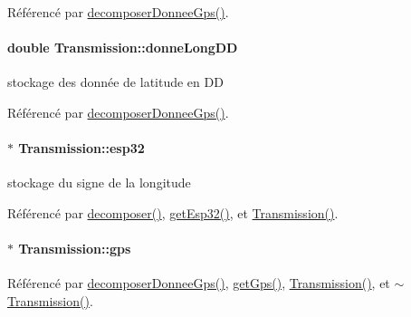 Référencé par \hyperlink{class_transmission_acc25e99cce910d23efe684cad233d30e}{decomposer\+Donnee\+Gps()}.

\paragraph[{\texorpdfstring{donne\+Long\+DD}{donneLongDD}}]{\setlength{\rightskip}{0pt plus 5cm}double Transmission\+::donne\+Long\+DD\hspace{0.3cm}{\ttfamily [private]}}\hypertarget{class_transmission_a285721af01428c688b33c7af80f424f5}{}\label{class_transmission_a285721af01428c688b33c7af80f424f5}
stockage des donnée de latitude en DD 

Référencé par \hyperlink{class_transmission_acc25e99cce910d23efe684cad233d30e}{decomposer\+Donnee\+Gps()}.

\paragraph[{\texorpdfstring{esp32}{esp32}}]{$\ast$ Transmission\+::esp32\hspace{0.3cm}{\ttfamily [private]}}\hypertarget{class_transmission_a06ec58d6f8fa4adff82f5b2ab911c461}{}\label{class_transmission_a06ec58d6f8fa4adff82f5b2ab911c461}
stockage du signe de la longitude 

Référencé par \hyperlink{class_transmission_aa2977705ec793b10bf3212a13e67b097}{decomposer()}, \hyperlink{class_transmission_afccd88f8be8c204a0960bc2d6970931f}{get\+Esp32()}, et \hyperlink{class_transmission_a1d8087d2d09b9ddd4fd6e8261daed9f3}{Transmission()}.

\paragraph[{\texorpdfstring{gps}{gps}}]{$\ast$ Transmission\+::gps\hspace{0.3cm}{\ttfamily [private]}}\hypertarget{class_transmission_aebadfef439f114cb09e57ddb2e3188dc}{}\label{class_transmission_aebadfef439f114cb09e57ddb2e3188dc}


Référencé par \hyperlink{class_transmission_acc25e99cce910d23efe684cad233d30e}{decomposer\+Donnee\+Gps()}, \hyperlink{class_transmission_aa5004c178152de5b94ef14e11e80792c}{get\+Gps()}, \hyperlink{class_transmission_a1d8087d2d09b9ddd4fd6e8261daed9f3}{Transmission()}, et \hyperlink{class_transmission_adcdc6012d99ddb1d0c3159d50984e146}{$\sim$\+Transmission()}.

